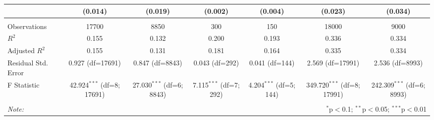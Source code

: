 \begin{table}[!htbp]
\begin{tabular}{@{\extracolsep{5pt}}lcccccc}
& (0.014) & (0.019) & (0.002) & (0.004) & (0.023) & (0.034) \\
\hline \\[-1.8ex]
 Observations & 17700 & 8850 & 300 & 150 & 18000 & 9000 \\
 $R^2$ & 0.155 & 0.132 & 0.200 & 0.193 & 0.336 & 0.334 \\
 Adjusted $R^2$ & 0.155 & 0.131 & 0.181 & 0.164 & 0.335 & 0.334 \\
 Residual Std. Error & 0.927 (df=17691) & 0.847 (df=8843) & 0.043 (df=292) & 0.041 (df=144) & 2.569 (df=17991) & 2.536 (df=8993) \\
 F Statistic & 42.924$^{***}$ (df=8; 17691) & 27.030$^{***}$ (df=6; 8843) & 7.115$^{***}$ (df=7; 292) & 4.204$^{***}$ (df=5; 144) & 349.720$^{***}$ (df=8; 17991) & 242.309$^{***}$ (df=6; 8993) \\
\hline
\hline \\[-1.8ex]
\textit{Note:} & \multicolumn{6}{r}{$^{*}$p$<$0.1; $^{**}$p$<$0.05; $^{***}$p$<$0.01} \\
\end{tabular}
\end{table}